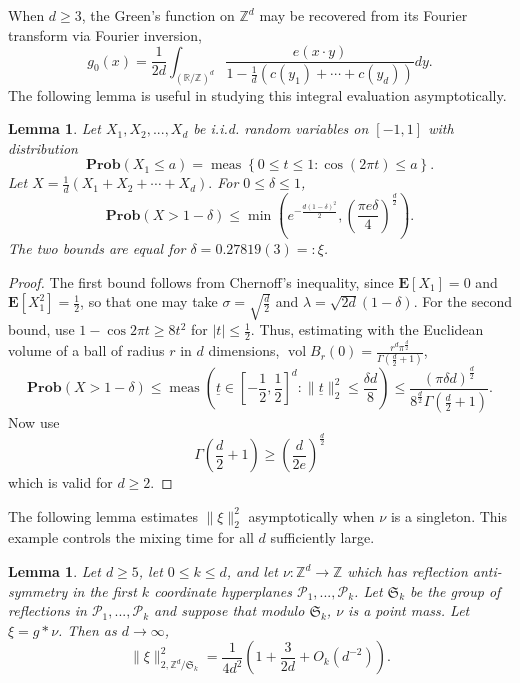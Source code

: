 \documentclass[a4paper, 12pt, notitlepage]{amsart}
\newcommand{\meas}{\operatorname{meas}}
\newcommand{\vol}{\operatorname{vol}}
\newcommand{\bR}{\mathbb{R}}
\newcommand{\zed}{\mathbb{Z}}
\newcommand{\E}{\mathbf{E}}
\newcommand{\Prob}{\mathbf{Prob}}
\newcommand{\ut}{\underline{t}}
\newcommand{\sP}{{\mathscr{P}}}
\newcommand{\fS}{{\mathfrak{S}}}
\newtheorem{lemma}[theorem]{Lemma}
\theoremstyle{remark}
\begin{document}
When $d \geq 3$, the Green's function on $\zed^d$ may be recovered from its Fourier transform via Fourier inversion,
\begin{equation}
 g_0(x) = \frac{1}{2d} \int_{(\bR/\zed)^d} \frac{e(x\cdot y)}{1-\frac{1}{d}(c(y_1) + \cdots + c(y_d) )}dy.
\end{equation}
The following lemma is useful in studying this integral evaluation asymptotically.
\begin{lemma}
 Let $X_1, X_2, ..., X_d$ be i.i.d. random variables on $[-1, 1]$ with distribution 
 \begin{equation}
  \Prob(X_1 \leq a) = \meas\left\{0 \leq t \leq 1: \cos(2\pi t) \leq a\right\}.
 \end{equation}
Let $X = \frac{1}{d}(X_1 + X_2 + \cdots + X_d).$  For $0 \leq \delta \leq 1$, 
\begin{equation}
 \Prob(X > 1-\delta) \leq \min\left(e^{-\frac{d(1-\delta)^2}{2}}, \left(\frac{\pi e\delta}{4}\right)^{\frac{d}{2}} \right) .
\end{equation}
The two bounds are equal for $\delta = 0.27819(3)=:\xi$.
\end{lemma}
\begin{proof}
 The first bound follows from Chernoff's inequality, since $\E[X_1] = 0$ and $\E[X_1^2] = \frac{1}{2}$, so that one may take $\sigma = \sqrt{\frac{d}{2}}$ and $\lambda = \sqrt{2d}(1-\delta)$.
 For the second bound, use $1-\cos 2\pi t \geq 8t^2$ for $|t| \leq \frac{1}{2}$. Thus, estimating with the Euclidean volume of a ball of radius $r$ in $d$ dimensions, 
 $\vol B_r(0) = \frac{r^d \pi^{\frac{d}{2}}}{\Gamma\left(\frac{d}{2}+1 \right)}$,
 \begin{equation}
 \Prob(X > 1-\delta) \leq \meas\left(\ut \in \left[-\frac{1}{2}, \frac{1}{2}\right]^d: \|\ut\|_2^2 \leq \frac{\delta d}{8} \right)\leq \frac{(\pi \delta d)^{\frac{d}{2}}}{8^{\frac{d}{2}}\Gamma\left(\frac{d}{2}+1 \right)}.
\end{equation}
Now use 
\begin{equation}
 \Gamma\left(\frac{d}{2}+1\right) \geq \left(\frac{d}{2e} \right)^{\frac{d}{2}}
\end{equation}
which is valid for $d \geq 2$.
\end{proof}

The following lemma estimates $\|\xi\|_2^2$ asymptotically when $\nu$ is a singleton.  This example controls the mixing time for all $d$ sufficiently large.

\begin{lemma}\label{Greens_fn_evaluation_d}
 Let $d \geq 5$, let $0 \leq k \leq d$, and let $\nu:\zed^d \to \zed$ which has reflection anti-symmetry in the first $k$ coordinate hyperplanes $\sP_1, ..., \sP_k$. Let $\fS_k$ be the group of reflections in $\sP_1, ..., \sP_k$ and suppose that modulo $\fS_k$, $\nu$ is a point mass. Let $\xi = g*\nu$.  Then as $d \to \infty$,
 \begin{equation}
  \|\xi\|_{2, \zed^d/\fS_k}^2 = \frac{1}{4d^2}\left(1 + \frac{3}{2d} + O_k\left(d^{-2}\right)\right).
 \end{equation}

\end{lemma}
\end{document}
